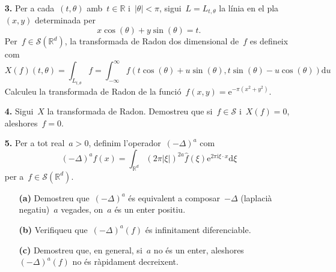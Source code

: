 \documentclass[a4paper]{article}
\theoremstyle{plain}
\theoremstyle{definition}
\newcommand{\iu}{\mathrm{i}}
\newcommand{\e}{\mathrm{e}}
\providecommand{\uppi}{\pi}
\newcommand{\diff}{\mathrm{d}}
\newcommand{\abs}[1]{\lvert{#1}\rvert}
\newcommand{\Sc}{\mathcal{S}}
\newcommand{\mlap}{-\Delta}
\newcommand{\RR}{\mathbb{R}}
\begin{document}
\begin{enumerate}
    \item[\textbf{3.}] Per a cada~\((t,\theta)\) amb~\(t\in\RR\)
        i~\(\abs{\theta}<\uppi\), sigui~\(L=L_{t,\theta}\) la línia en el
        pla~\((x,y)\) determinada per
        \[
            x\cos(\theta) + y\sin(\theta) = t.
        \]
        Per~\(f\in\Sc(\RR^{d})\), la transformada de Radon dos dimensional
        de~\(f\) es defineix com
        \[
            X(f)(t,\theta)
            =
            \int_{L_{t,\theta}}f
            =
            \int_{-\infty}^{\infty}
            f(t\cos(\theta) + u\sin(\theta), t\sin(\theta) - u\cos(\theta))
            \diff u
        \]
        Calculeu la transformada de Radon de la
        funció~\(f(x,y)=\e^{-\uppi(x^{2}+y^{2})}\).
\end{enumerate}

\begin{enumerate}
    \item[\textbf{4.}] Sigui~\(X\) la transformada de Radon. Demostreu que
        si~\(f\in\Sc\) i~\(X(f)=0\), aleshores~\(f=0\).
\end{enumerate}

\begin{enumerate}
    \item[\textbf{5.}] Per a tot real~\(a>0\), definim
        l'operador~\((\mlap)^{a}\) com
        \[
            (\mlap)^{a}f(x)
            =
            \int_{\RR^{d}}
            (2\uppi\abs{\xi})^{2a}
            \widehat{f}(\xi)
            \e^{2\uppi\iu\xi\cdot x}
            \diff\xi
        \]
        per a~\(f\in\Sc(\RR^{d})\).
        \begin{enumerate}
            \item[\textbf{(a)}] Demostreu que~\((\mlap)^{a}\) és equivalent a
                composar~\(\mlap\) (laplacià negatiu)~\(a\) vegades, on~\(a\)
                és un enter positiu.
        \end{enumerate}
\end{enumerate}

\begin{enumerate}
    \item[]\begin{enumerate}
        \item[\textbf{(b)}] Verifiqueu que~\((\mlap)^{a}(f)\) és infinitament
            diferenciable.
    \end{enumerate}
\end{enumerate}

\begin{enumerate}
    \item[]\begin{enumerate}
        \item[\textbf{(c)}] Demostreu que, en general, si~\(a\) no és un enter,
            aleshores~\((\mlap)^{a}(f)\) no és ràpidament decreixent.
    \end{enumerate}
\end{enumerate}
\end{document}
